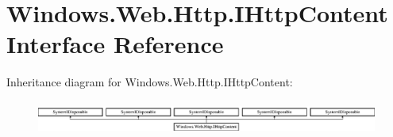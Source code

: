 \hypertarget{interface_windows_1_1_web_1_1_http_1_1_i_http_content}{}\section{Windows.\+Web.\+Http.\+I\+Http\+Content Interface Reference}
\label{interface_windows_1_1_web_1_1_http_1_1_i_http_content}
Inheritance diagram for Windows.\+Web.\+Http.\+I\+Http\+Content\+:\begin{figure}[H]
\begin{center}
\leavevmode
\includegraphics[height=1.137056cm]{interface_windows_1_1_web_1_1_http_1_1_i_http_content}
\end{center}
\end{figure}
